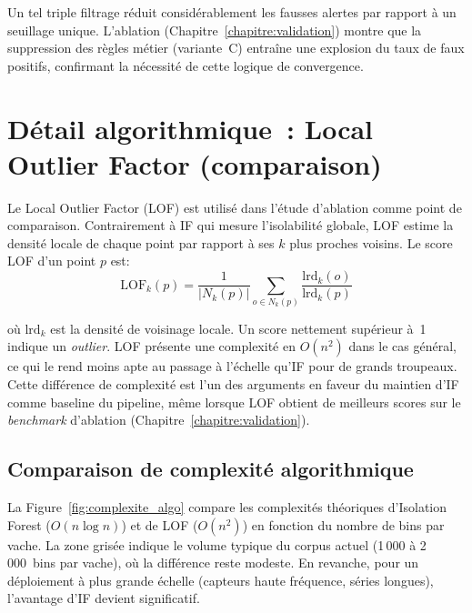 Un tel triple filtrage réduit considérablement les fausses alertes par rapport à un seuillage
unique. L'ablation (Chapitre~\ref{chapitre:validation}) montre que la suppression des
règles métier (variante~C) entraîne une explosion du taux de faux positifs, confirmant
la nécessité de cette logique de convergence.

\FloatBarrier
\section{Détail algorithmique~: Local Outlier Factor (comparaison)}

Le Local Outlier Factor (LOF) \citep{breunig2000lof} est utilisé dans l'étude
d'ablation comme point de comparaison. Contrairement à IF qui mesure l'isolabilité globale,
LOF estime la densité locale de chaque point par rapport à ses $k$ plus proches voisins.
Le score LOF d'un point $p$ est:
\begin{equation}
    \text{LOF}_k(p) = \frac{1}{|N_k(p)|} \sum_{o \in N_k(p)}
    \frac{\text{lrd}_k(o)}{\text{lrd}_k(p)}
\end{equation}

\noindent
où $\text{lrd}_k$ est la densité de voisinage locale. Un score nettement supérieur à~1
indique un \textit{outlier}. LOF présente une complexité en $O(n^2)$ dans le cas général, ce
qui le rend moins apte au passage à l'échelle qu'IF pour de grands troupeaux. Cette différence de complexité est l'un
des arguments en faveur du maintien d'IF comme baseline du pipeline, même lorsque LOF
obtient de meilleurs scores sur le \textit{benchmark} d'ablation
(Chapitre~\ref{chapitre:validation}).

\subsection{Comparaison de complexité algorithmique}

La Figure~\ref{fig:complexite_algo} compare les complexités théoriques d'Isolation Forest
($O(n \log n)$) et de LOF ($O(n^2)$) en fonction du nombre de bins par vache. La zone
grisée indique le volume typique du corpus actuel (1\,000 à 2\,000~bins par vache),
où la différence reste modeste. En revanche, pour un déploiement à plus grande échelle
(capteurs haute fréquence, séries longues), l'avantage d'IF devient significatif.

